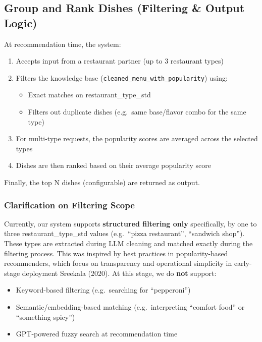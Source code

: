 \documentclass[
  11pt,
  a4paper,
  DIV=11,
  numbers=noendperiod]{scrartcl}
\providecommand{\tightlist}{%
  \setlength{\itemsep}{0pt}\setlength{\parskip}{0pt}}\usepackage{longtable,booktabs,array}
\begin{document}
\subsection{Group and Rank Dishes (Filtering \& Output
Logic)}\label{group-and-rank-dishes-filtering-output-logic}

At recommendation time, the system:

\begin{enumerate}
\def\labelenumi{\arabic{enumi}.}
\tightlist
\item
  Accepts input from a restaurant partner (up to 3 restaurant types)
\item
  Filters the knowledge base (\texttt{cleaned\_menu\_with\_popularity})
  using:

  \begin{itemize}
  \tightlist
  \item
    Exact matches on restaurant\_type\_std
  \item
    Filters out duplicate dishes (e.g.~same base/flavor combo for the
    same type)
  \end{itemize}
\item
  For multi-type requests, the popularity scores are averaged across the
  selected types
\item
  Dishes are then ranked based on their average popularity score
\end{enumerate}

Finally, the top N dishes (configurable) are returned as output.

\subsubsection{Clarification on Filtering
Scope}\label{clarification-on-filtering-scope}

Currently, our system supports \textbf{structured filtering only}
specifically, by one to three restaurant\_type\_std values (e.g.~``pizza
restaurant'', ``sandwich shop''). These types are extracted during LLM
cleaning and matched exactly during the filtering process. This was
inspired by best practices in popularity-based recommenders, which focus
on transparency and operational simplicity in early-stage deployment
Sreekala (2020). At this stage, we do \textbf{not} support:

\begin{itemize}
\tightlist
\item
  Keyword-based filtering (e.g.~searching for ``pepperoni'')
\item
  Semantic/embedding-based matching (e.g.~interpreting ``comfort food''
  or ``something spicy'')
\item
  GPT-powered fuzzy search at recommendation time
\end{itemize}
\end{document}
